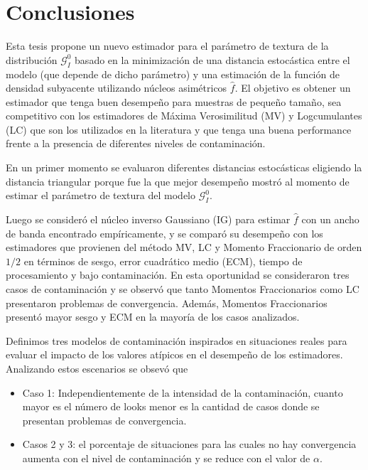 
\chapter{Conclusiones}
\label{Conclusiones}

Esta tesis propone un nuevo estimador para el parámetro de textura de la distribución $\mathcal{G}_I^0$ basado en la minimización de una distancia estocástica entre el modelo (que depende de dicho parámetro) y una estimación de la función de densidad subyacente utilizando núcleos asimétricos $\widehat{f}$. El objetivo es obtener un estimador que tenga buen desempeño para muestras de pequeño tamaño, sea competitivo con los estimadores de Máxima Verosimilitud (MV) y Logcumulantes (LC) que son los utilizados en la literatura y que tenga una buena performance frente a la presencia de diferentes niveles de contaminación.


En un primer momento se evaluaron diferentes distancias estocásticas eligiendo la distancia triangular porque fue la que mejor desempeño mostró al momento de estimar el parámetro de textura del modelo $\mathcal{G}_I^0$.

Luego se consideró el núcleo inverso Gaussiano (IG) para estimar $\widehat{f}$ con un ancho de banda encontrado empíricamente, y se comparó su desempeño con los estimadores que provienen del método MV, LC y Momento Fraccionario de orden $1/2$ en términos de sesgo, error cuadrático medio (ECM), tiempo de procesamiento y bajo contaminación. En esta oportunidad se consideraron tres casos de contaminación y se observó que tanto Momentos Fraccionarios como LC presentaron problemas de convergencia. Además, Momentos Fraccionarios presentó mayor sesgo y ECM en la mayoría de los casos analizados.

Definimos tres modelos de contaminación inspirados en situaciones reales para evaluar el impacto de los valores atípicos en el desempeño de los estimadores. Analizando estos escenarios se obsevó que

\begin{itemize}
	\item Caso 1: Independientemente de la intensidad de la contaminación, cuanto mayor es el número de looks menor es la cantidad de casos donde se presentan problemas de convergencia. 
	\item  Casos 2 y 3: el porcentaje de situaciones para las cuales no hay convergencia aumenta con el nivel de contaminación y se reduce con el valor de $\alpha$.
\end{itemize}


